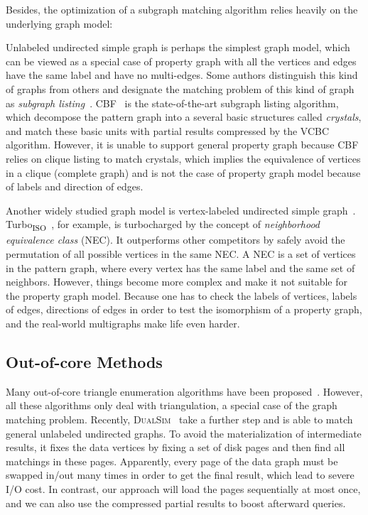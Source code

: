 Besides, the optimization of a subgraph matching algorithm relies heavily on the underlying graph model:

Unlabeled undirected simple graph is perhaps the simplest graph model,
which can be viewed as a special case of property graph with all the vertices and edges have the same label and have no multi-edges.
Some authors distinguish this kind of graphs from others and designate the matching problem of this kind of graph as \emph{subgraph listing}~\cite{DBLP:conf/sigmod/ShaoCCMYX14,DBLP:journals/jacm/Ullmann76,DBLP:conf/sigmod/ShaoCCMYX14,DBLP:journals/pvldb/LaiQLC15,DBLP:conf/sigmod/KimLBHLKJ16,DBLP:journals/pvldb/LaiQLZC16,DBLP:journals/pvldb/QiaoZC17}.
CBF~\cite{DBLP:journals/pvldb/QiaoZC17} is the state-of-the-art subgraph listing algorithm,
which decompose the pattern graph into a several basic structures called \emph{crystals},
and match these basic units with partial results compressed by the VCBC algorithm.
However, it is unable to support general property graph because CBF relies on clique listing to match crystals,
which implies the equivalence of vertices in a clique (complete graph) and is not the case of property graph model because of labels and direction of edges.

Another widely studied graph model is vertex-labeled undirected simple graph~\cite{DBLP:journals/pvldb/ShangZLY08,DBLP:journals/pvldb/SunWWSL12,DBLP:conf/sigmod/HanLL13,DBLP:conf/cloud/SerafiniMS17,DBLP:conf/sigmod/DiasTGM019}.
Turbo\textsubscript{ISO}~\cite{DBLP:conf/sigmod/HanLL13}, for example, is turbocharged by the concept of \emph{neighborhood equivalence class} (NEC).
It outperforms other competitors by safely avoid the permutation of all possible vertices in the same NEC\@.
A NEC is a set of vertices in the pattern graph, where every vertex has the same label and the same set of neighbors.
However, things become more complex and make it not suitable for the property graph model.
Because one has to check the labels of vertices, labels of edges, directions of edges in order to test the isomorphism of a property graph, and the real-world multigraphs make life even harder.
\subsection*{Out-of-core Methods}
Many out-of-core triangle enumeration algorithms have been proposed~\cite{DBLP:conf/kdd/ChuC11,DBLP:conf/osdi/KyrolaBG12,DBLP:conf/sigmod/HuTC13,DBLP:conf/sigmod/KimHLPY14}.
However, all these algorithms only deal with triangulation, a special case of the graph matching problem.
Recently, \textsc{DualSim}~\cite{DBLP:conf/sigmod/KimLBHLKJ16} take a further step and is able to match general unlabeled undirected graphs.
To avoid the materialization of intermediate results,
it fixes the data vertices by fixing a set of disk pages and then find all matchings in these pages.
Apparently, every page of the data graph must be swapped in/out many times in order to get the final result,
which lead to severe I/O cost.
In contrast, our approach will load the pages sequentially at most once,
and we can also use the compressed partial results to boost afterward queries.
